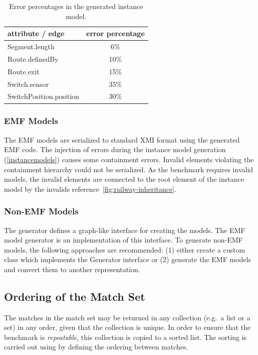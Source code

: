 \documentclass[submission,copyright,creativecommons]{eptcs}
\newcommand{\figref}[1]{\autoref{fig:#1}}
\begin{document}
\begin{table}
	\centering
	\begin{tabular}{ | l | c | }
		\hline
		\bf attribute / edge & \bf error percentage \\\hline
		\sf Segment.length          & 6\%  \\\hline
		\sf Route.definedBy         & 10\% \\\hline
		\sf Route.exit              & 15\% \\\hline
		\sf Switch.sensor           & 35\% \\\hline
		\sf SwitchPosition.position & 30\% \\\hline
	\end{tabular}
	\caption{Error percentages in the generated instance model.}
	\label{tab:errorpercentages}
\end{table}

\subsubsection{EMF Models}

The EMF models are serialized to standard XMI format using the generated EMF code. The injection of errors during the instance model generation (\autoref{instancemodels}) causes some containment errors. Invalid elements violating the containment hierarchy could not be serialized. As the benchmark requires invalid models, the invalid elements are connected to the root element of the instance model by the \textsf{invalids} reference~\figref{railway-inheritance}.

\subsubsection{Non-EMF Models}

The generator defines a graph-like interface for creating the models. The EMF model generator is an implementation of this interface. To generate non-EMF models, the following approaches are recommended: (1) either create a custom class which implements the \textsf{Generator} interface or (2) generate the EMF models and convert them to another representation.

\subsection{Ordering of the Match Set}
\label{ordering}

The matches in the match set may be returned in any collection (e.g.\ a list or a set) in any order, given that the collection is unique. In order to ensure that the benchmark is \emph{repeatable}, this collection is copied to a sorted list. The sorting is carried out using by defining the ordering between matches.
\end{document}
